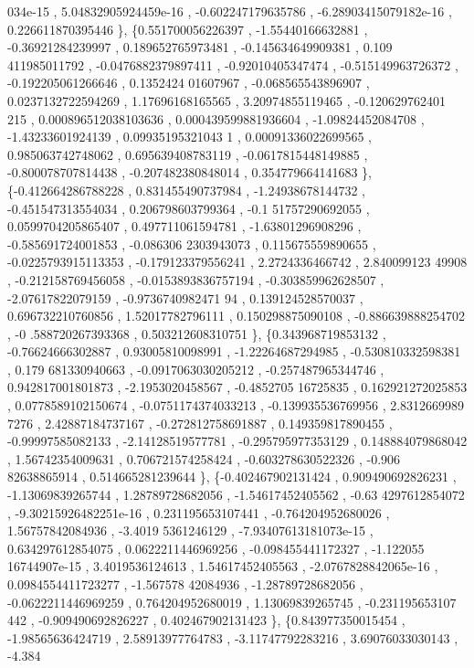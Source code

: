 \begin{DoxyCode}
      034e-15 , 5.04832905924459e-16 , -0.602247179635786 , -6.28903415079182e-16 , 0.226611870395446 \},
\{0.551700056226397 , -1.55440166632881 , -0.36921284239997 , 0.189652765973481 , -0.145634649909381 , 0.109
      411985011792 , -0.0476882379897411 , -0.92010405347474 , -0.515149963726372 , -0.192205061266646 , 0.1352424
      01607967 , -0.068565543896907 , 0.0237132722594269 ,  1.17696168165565 ,  3.20974855119465 , -0.120629762401
      215 , 0.000896512038103636 , 0.000439599881936604 , -1.09824452084708 , -1.43233601924139 , 0.09935195321043
      1 , 0.00091336022699565 , 0.985063742748062 , 0.695639408783119 , -0.0617815448149885 , -0.800078707814438 ,
       -0.207482380848014 , 0.354779664141683 \},
\{-0.412664286788228 , 0.831455490737984 , -1.24938678144732 , -0.451547313554034 , 0.206798603799364 , -0.1
      51757290692055 , 0.0599704205865407 , 0.497711061594781 , -1.63801296908296 , -0.585691724001853 , -0.086306
      2303943073 , 0.115675559890655 , -0.0225793915113353 , -0.179123379556241 ,   2.2724336466742 ,  2.840099123
      49908 , -0.212158769456058 , -0.0153893836757194 , -0.303859962628507 , -2.07617822079159 , -0.9736740982471
      94 , 0.139124528570037 , 0.696732210760856 ,  1.52017782796111 , 0.150298875090108 , -0.886639888254702 , -0
      .588720267393368 , 0.503212608310751 \},
\{0.343968719853132 , -0.76624666302887 ,  0.93005810098991 , -1.22264687294985 , -0.530810332598381 , 0.179
      681330940663 , -0.0917063030205212 , -0.257487965344746 , 0.942817001801873 ,  -2.1953020458567 , -0.4852705
      16725835 , 0.162921272025853 , 0.0778589102150674 , -0.0751174374033213 , -0.139935536769956 ,  2.8312669989
      7276 ,  2.42887184737167 , -0.272812758691887 , 0.149359817890455 , -0.99997585082133 , -2.14128519577781 , 
      -0.295795977353129 , 0.148884079868042 ,  1.56742354009631 , 0.706721574258424 , -0.603278630522326 , -0.906
      82638865914 , 0.514665281239644 \},
\{-0.402467902131424 , 0.909490692826231 , -1.13069839265744 ,  1.28789728682056 , -1.54617452405562 , -0.63
      4297612854072 , -9.30215926482251e-16 , 0.231195653107441 , -0.764204952680026 ,  1.56757842084936 , -3.4019
      5361246129 , -7.93407613181073e-15 , 0.634297612854075 , 0.0622211446969256 , -0.098455441172327 , -1.122055
      16744907e-15 ,   3.4019536124613 ,  1.54617452405563 , -2.0767828842065e-16 , 0.0984554411723277 , -1.567578
      42084936 , -1.28789728682056 , -0.0622211446969259 , 0.764204952680019 ,  1.13069839265745 , -0.231195653107
      442 , -0.909490692826227 , 0.402467902131423 \},
\{0.843977350015454 , -1.98565636424719 ,  2.58913977764783 , -3.11747792283216 ,  3.69076033030143 , -4.384

\end{DoxyCode}
